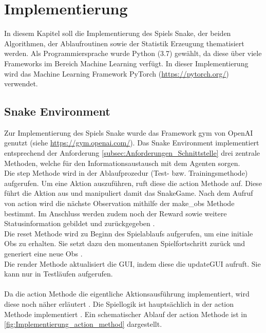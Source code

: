 \chapter{Implementierung} \label{chap:Implementierung}
In diesem Kapitel soll die Implementierung des Spiels Snake, der beiden Algorithmen, der Ablaufroutinen sowie der Statistik Erzeugung thematisiert werden. Als Programmiersprache wurde Python (3.7) gewählt, da diese über viele Frameworks im Bereich Machine Learning verfügt.
In dieser Implementierung wird das Machine Learning Framework PyTorch (\url{https://pytorch.org/}) verwendet.

\section{Snake Environment} \label{sec:Implementierung_Environment}
Zur Implementierung des Spiels Snake wurde das Framework gym von OpenAI genutzt (siehe \url{https://gym.openai.com/}). Das Snake Environment implementiert entsprechend der Anforderung \ref{subsec:Anforderungen_Schnittstelle} drei zentrale Methoden, welche für den Informationsaustausch mit dem Agenten sorgen.\\ 
Die step Methode  wird in der Ablaufprozedur (Test- bzw. Trainingsmethode) aufgerufen. Um eine Aktion auszuführen, ruft diese die action Methode auf. Diese führt die Aktion aus und manipuliert damit das SnakeGame.
Nach dem Aufruf von  action wird die nächste Observation mithilfe der make\_obs Methode bestimmt. Im Anschluss werden zudem noch der Reward sowie weitere Statusinformation gebildet und zurückgegeben .\\
Die reset Methode  wird zu Beginn des Spielablaufs aufgerufen, um eine initiale Obs zu erhalten. Sie setzt dazu den momentanen Spielfortschritt zurück und generiert eine neue Obs .\\
Die render Methode  aktualisiert die GUI, indem diese die updateGUI aufruft. Sie kann nur in Testläufen aufgerufen.\\
\\Da die action Methode die eigentliche Aktionsausführung implementiert, wird diese noch näher erläutert .
Die Spiellogik ist hauptsächlich in der action Methode implementiert . Ein schematischer Ablauf der action Methode ist in \autoref{fig:Implementierung_action_method} dargestellt.
